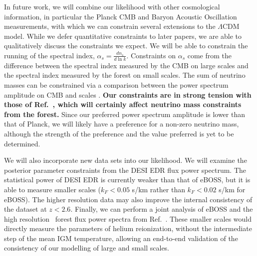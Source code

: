 In future work, we will combine our \Lya likelihood with other cosmological information, in particular the Planck CMB and Baryon Acoustic Oscillation measurements, with which we can constrain several extensions to the $\Lambda$CDM model.
While we defer quantitative constraints to later papers, we are able to qualitatively discuss the constraints we expect.
We will be able to constrain the running of the spectral index, $\alpha_s = \frac{d n_s}{d \ln k}$.
Constraints on $\alpha_s$ come from the difference between the spectral index measured by the CMB on large scales and the spectral index measured by the \Lya forest on small scales.
The sum of neutrino masses can be constrained via a comparison between the power spectrum amplitude on CMB and \Lya scales \cite{2020JCAP...04..025P}. \textbf{Our constraints are in strong tension with those of Ref.~\cite{2020JCAP...04..038P}, which will certainly affect neutrino mass constraints from the \Lya forest.}
Since our preferred power spectrum amplitude is lower than that of Planck, we will likely have a preference for a non-zero neutrino mass, although the strength of the preference and the value preferred is yet to be determined. 

We will also incorporate new data sets into our likelihood.
We will examine the posterior parameter constraints from the DESI EDR flux power spectrum.
The statistical power of DESI EDR is currently weaker than that of eBOSS, but it is able to measure smaller scales ($k_F < 0.05$ s/km rather than $k_F < 0.02$ s/km for eBOSS).
The higher resolution data may also improve the internal consistency of the dataset at $z < 2.6$.
Finally, we can perform a joint analysis of eBOSS and the high resolution \Lya~forest flux power spectra from Ref.~\cite{2022MNRAS.509.2842K}.
These smaller scales would directly measure the parameters of helium reionization, without the intermediate step of the mean IGM temperature, allowing an end-to-end validation of the consistency of our modelling of large and small scales.
